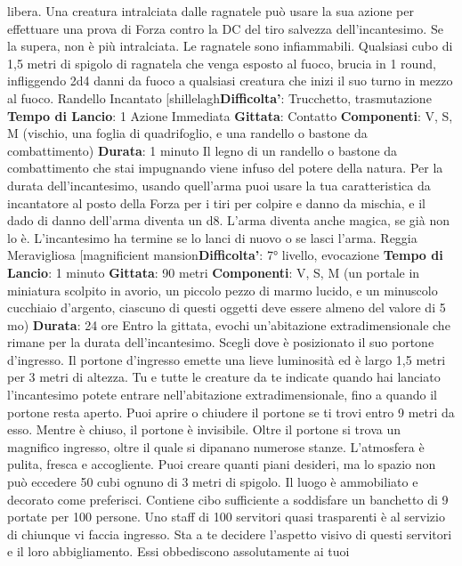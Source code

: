 \begin{multicols}{2}
libera.
Una creatura intralciata dalle ragnatele può usare la
sua azione per effettuare una prova di Forza contro la
DC del tiro salvezza dell’incantesimo. Se la supera, non
è più intralciata.
Le ragnatele sono infiammabili. Qualsiasi cubo di 1,5
metri di spigolo di ragnatela che venga esposto al
fuoco, brucia in 1 round, infliggendo 2d4 danni da fuoco
a qualsiasi creatura che inizi il suo turno in mezzo al
fuoco.
Randello Incantato
[shillelagh\textbf{Difficolta'}:
Trucchetto, trasmutazione
\textbf{Tempo di Lancio}: 1 Azione Immediata
\textbf{Gittata}: Contatto
\textbf{Componenti}: V, S, M (vischio, una foglia di
quadrifoglio, e una randello o bastone da
combattimento)
\textbf{Durata}: 1 minuto
Il legno di un randello o bastone da combattimento che
stai impugnando viene infuso del potere della natura.
Per la durata dell’incantesimo, usando quell’arma puoi
usare la tua caratteristica da incantatore al posto della
Forza per i tiri per colpire e danno da mischia, e il dado
di danno dell’arma diventa un d8. L’arma diventa anche
magica, se già non lo è. L’incantesimo ha termine se lo
lanci di nuovo o se lasci l’arma.
Reggia Meravigliosa
[magnificient mansion\textbf{Difficolta'}:
7° livello, evocazione
\textbf{Tempo di Lancio}: 1 minuto
\textbf{Gittata}: 90 metri
\textbf{Componenti}: V, S, M (un portale in miniatura scolpito
in avorio, un piccolo pezzo di marmo lucido, e un
minuscolo cucchiaio d’argento, ciascuno di questi
oggetti deve essere almeno del valore di 5 mo)
\textbf{Durata}: 24 ore
Entro la gittata, evochi un’abitazione extradimensionale
che rimane per la durata dell’incantesimo. Scegli dove è
posizionato il suo portone d’ingresso. Il portone
d’ingresso emette una lieve luminosità ed è largo 1,5
metri per 3 metri di altezza. Tu e tutte le creature da te
indicate quando hai lanciato l’incantesimo potete
entrare nell’abitazione extradimensionale, fino a quando
il portone resta aperto. Puoi aprire o chiudere il portone
se ti trovi entro 9 metri da esso. Mentre è chiuso, il
portone è invisibile.
Oltre il portone si trova un magnifico ingresso, oltre il
quale si dipanano numerose stanze. L’atmosfera è
pulita, fresca e accogliente.
Puoi creare quanti piani desideri, ma lo spazio non può
eccedere 50 cubi ognuno di 3 metri di spigolo. Il luogo è
ammobiliato e decorato come preferisci. Contiene cibo
sufficiente a soddisfare un banchetto di 9 portate per
100 persone. Uno staff di 100 servitori quasi trasparenti
è al servizio di chiunque vi faccia ingresso. Sta a te
decidere l’aspetto visivo di questi servitori e il loro
abbigliamento. Essi obbediscono assolutamente ai tuoi

\end{multicols}
